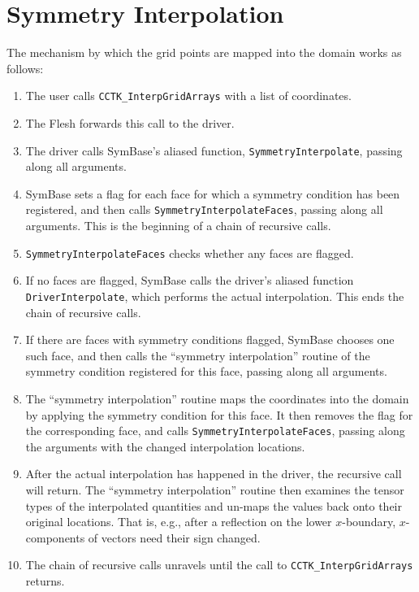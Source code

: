 \section{Symmetry Interpolation}

The mechanism by which the grid points are mapped into the domain
works as follows:
\begin{enumerate}
	\item The user calls \texttt{CCTK\_InterpGridArrays} with a list of
	  coordinates.
	\item The Flesh forwards this call to the driver.
	\item The driver calls SymBase's aliased function,
	  \texttt{SymmetryInterpolate}, passing along all arguments.
	\item SymBase sets a flag for each face for which a symmetry
	  condition has been registered, and then calls
	  \texttt{SymmetryInterpolateFaces}, passing along all arguments.
	  This is the beginning of a chain of recursive calls.
	\item \texttt{SymmetryInterpolateFaces} checks whether any faces are
	  flagged.
	\item If no faces are flagged, SymBase calls the driver's aliased
	  function \texttt{DriverInterpolate}, which performs the actual
	  interpolation.  This ends the chain of recursive calls.
	\item If there are faces with symmetry conditions flagged, SymBase
	  chooses one such face, and then calls the ``symmetry interpolation''
	  routine of the symmetry condition registered for this face,
	  passing along all arguments.
	\item The ``symmetry interpolation'' routine maps the coordinates into
	  the domain by applying the symmetry condition for this face.  It
	  then removes the flag for the corresponding face, and calls
	  \texttt{SymmetryInterpolateFaces}, passing along the arguments with
	  the changed interpolation locations.
	\item After the actual interpolation has happened in the driver, the
	  recursive call will return.  The ``symmetry interpolation'' routine
	  then examines the tensor types of the interpolated quantities and
	  un-maps the values back onto their original locations.  That is,
	  e.g., after a reflection on the lower $x$-boundary, $x$-components
	  of vectors need their sign changed.
	\item The chain of recursive calls unravels until the call to
	  \texttt{CCTK\_InterpGridArrays} returns.
\end{enumerate}


